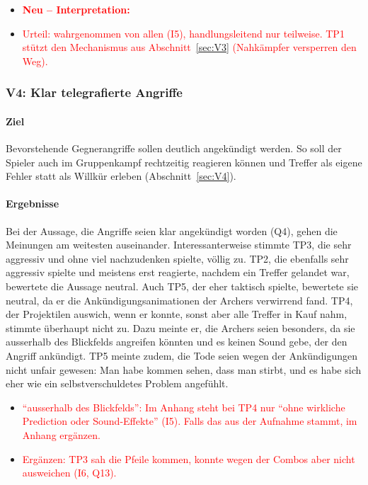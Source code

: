 \documentclass[../Main.tex]{subfiles}
\begin{document}
\begin{itemize}[leftmargin=1.5cm]
    \item \textcolor{red}{\textbf{Neu -- Interpretation:}}
    \item \textcolor{red}{Urteil: wahrgenommen von allen (I5), handlungsleitend nur teilweise. TP1 stützt den Mechanismus aus Abschnitt~\ref{sec:V3} (Nahkämpfer versperren den Weg).}
\end{itemize}

\subsubsection{V4: Klar telegrafierte Angriffe}

\paragraph{Ziel}
Bevorstehende Gegnerangriffe sollen deutlich angekündigt werden. So soll der Spieler auch im Gruppenkampf rechtzeitig reagieren können und Treffer als eigene Fehler statt als Willkür erleben (Abschnitt~\ref{sec:V4}).

\paragraph{Ergebnisse}
Bei der Aussage, die Angriffe seien klar angekündigt worden (Q4), gehen die Meinungen am weitesten auseinander. Interessanterweise stimmte TP3, die sehr aggressiv und ohne viel nachzudenken spielte, völlig zu. TP2, die ebenfalls sehr aggressiv spielte und meistens erst reagierte, nachdem ein Treffer gelandet war, bewertete die Aussage neutral. Auch TP5, der eher taktisch spielte, bewertete sie neutral, da er die Ankündigungsanimationen der Archers verwirrend fand. TP4, der Projektilen auswich, wenn er konnte, sonst aber alle Treffer in Kauf nahm, stimmte überhaupt nicht zu. Dazu meinte er, die Archers seien besonders, da sie ausserhalb des Blickfelds angreifen könnten und es keinen Sound gebe, der den Angriff ankündigt. TP5 meinte zudem, die Tode seien wegen der Ankündigungen nicht unfair gewesen: Man habe kommen sehen, dass man stirbt, und es habe sich eher wie ein selbstverschuldetes Problem angefühlt.

\begin{itemize}[leftmargin=1.5cm]
    \item \textcolor{red}{\enquote{ausserhalb des Blickfelds}: Im Anhang steht bei TP4 nur \enquote{ohne wirkliche Prediction oder Sound-Effekte} (I5). Falls das aus der Aufnahme stammt, im Anhang ergänzen.}
    \item \textcolor{red}{Ergänzen: TP3 sah die Pfeile kommen, konnte wegen der Combos aber nicht ausweichen (I6, Q13).}
\end{itemize}
\end{document}
